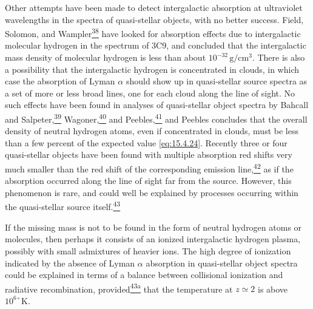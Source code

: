 Other attempts have been made to detect intergalactic absorption at
ultraviolet wavelengths in the spectra of quasi-stellar objects, with no better
success. Field, Solomon, and
Wampler\hyperref[ch15-ref-38]{\textsuperscript{38}} have looked for
absorption effects due to intergalactic molecular hydrogen in the spectrum of
3C9, and concluded that the intergalactic mass density of molecular hydrogen is
less than about \(10^{-32}\,\mathrm{g/cm^3}\). There is also a possibility
that the intergalactic hydrogen is concentrated in clouds, in which case the
absorption of Lyman \(\alpha\) should show up in quasi-stellar source spectra
as a set of more or less broad lines, one for each cloud along the line of
sight. No such effects have been found in analyses of quasi-stellar object
spectra by Bahcall and Salpeter,\hyperref[ch15-ref-39]{\textsuperscript{39}}
Wagoner,\hyperref[ch15-ref-40]{\textsuperscript{40}} and
Peebles,\hyperref[ch15-ref-41]{\textsuperscript{41}} and Peebles concludes
that the overall density of neutral hydrogen atoms, even if concentrated in
clouds, must be less than a few percent of the expected value
\eqref{eq:15.4.24}. Recently three or four quasi-stellar objects have been
found with multiple absorption red shifts very much smaller than the red shift
of the corresponding emission line,\hyperref[ch15-ref-42]{\textsuperscript{42}}
as if the absorption occurred along the line of sight far from the source.
However, this phenomenon is rare, and could well be explained by processes
occurring within the quasi-stellar source
itself.\hyperref[ch15-ref-43]{\textsuperscript{43}}

If the missing mass is not to be found in the form of neutral hydrogen atoms
or molecules, then perhaps it consists of an ionized intergalactic hydrogen
plasma, possibly with small admixtures of heavier ions. The high degree of
ionization indicated by the absence of Lyman \(\alpha\) absorption in
quasi-stellar object spectra could be explained in terms of a balance between
collisional ionization and radiative recombination,
provided\hyperref[ch15-ref-43a]{\textsuperscript{43a}} that the temperature
at \(z\simeq2\) is above \(10^{6\circ}\mathrm{K}\).


